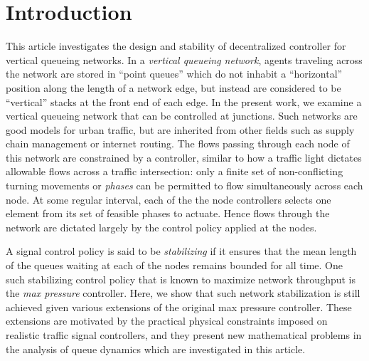 \section{Introduction}

This article investigates the design and stability of decentralized controller for vertical queueing networks. In a \emph{vertical queueing network}, agents traveling across the network are stored in ``point queues'' which do not inhabit a ``horizontal'' position along the length of a network edge, but instead are considered to be ``vertical'' stacks at the front end of each edge. In the present work, we examine a vertical queueing network that can be controlled at junctions. Such networks are good models for urban traffic, but are inherited from other fields such as supply chain management or internet routing.
 The flows passing through each node of this network are constrained by a controller, similar to how a traffic light dictates allowable flows across a traffic intersection: only a finite set of non-conflicting turning movements or \emph{phases} can be permitted to flow simultaneously across each node. 
At some regular interval, each of the the node controllers selects one element from its set of feasible phases to actuate. Hence flows through the network are dictated largely by the control policy applied at the nodes. 

A signal control policy is said to be \emph{stabilizing} if it ensures that the mean length of the queues waiting at each of the nodes remains bounded for all time. One such stabilizing control policy that is known to maximize network throughput is the \emph{max pressure} controller. Here, we show that such network stabilization is still achieved given various extensions of the original max pressure controller. These extensions are motivated by the practical physical constraints imposed on realistic traffic signal controllers, and they present new mathematical problems in the analysis of queue dynamics which are investigated in this article. 




